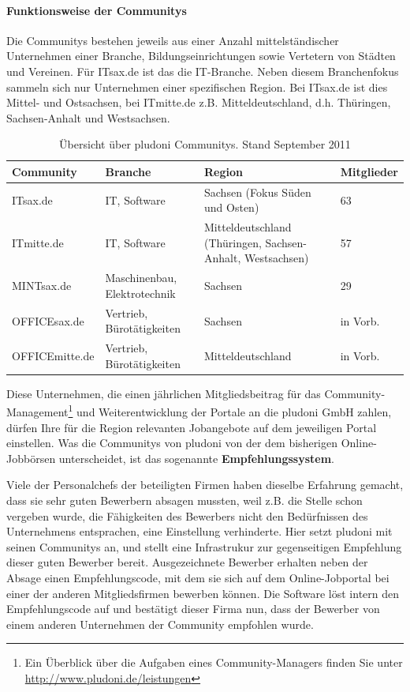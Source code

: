 \paragraph{Funktionsweise der Communitys}
Die Communitys bestehen jeweils aus einer Anzahl mittelständischer Unternehmen einer Branche, Bildungseinrichtungen sowie Vertetern von Städten und Vereinen. Für ITsax.de ist das die IT-Branche. Neben diesem Branchenfokus sammeln sich nur Unternehmen einer spezifischen Region. Bei ITsax.de ist dies Mittel- und Ostsachsen, bei ITmitte.de z.B. Mitteldeutschland, d.h. Thüringen, Sachsen-Anhalt und Westsachsen. 
\begin{table}[htbp]
\label{tb:dt}
\caption{Übersicht über pludoni Communitys. Stand September 2011}
\begin{tabular}{|l|p{2.8cm}|p{5cm}|l|}
\hline
\rowcolor{Gray}
Community & Branche & Region & Mitglieder \\\hline
ITsax.de & IT, Software &  Sachsen (Fokus Süden und Osten) & 63\\\hline
ITmitte.de & IT, Software &  Mitteldeutschland (Thüringen, Sachsen-Anhalt, Westsachsen) & 57 \\\hline
MINTsax.de & Maschinenbau, Elektrotechnik &  Sachsen & 29\\\hline
OFFICEsax.de & Vertrieb, Bürotätigkeiten &  Sachsen & in Vorb.\\\hline
OFFICEmitte.de & Vertrieb, Bürotätigkeiten &  Mitteldeutschland & in Vorb.\\\hline
\end{tabular}
\end{table}

Diese Unternehmen, die einen jährlichen Mitgliedsbeitrag für das Community-Management\footnote{Ein Überblick über die Aufgaben eines Community-Managers finden Sie unter \url{http://www.pludoni.de/leistungen}} und Weiterentwicklung der Portale an die pludoni GmbH zahlen, dürfen Ihre für die Region relevanten Jobangebote auf dem jeweiligen Portal einstellen. Was die Communitys von pludoni von der dem bisherigen Online-Jobbörsen unterscheidet, ist das sogenannte \textbf{Empfehlungssystem}. 

Viele der Personalchefs der beteiligten Firmen haben dieselbe Erfahrung gemacht, dass sie sehr guten Bewerbern absagen mussten, weil z.B. die Stelle schon vergeben wurde, die Fähigkeiten des Bewerbers nicht den Bedürfnissen des Unternehmens entsprachen, eine Einstellung verhinderte. Hier setzt pludoni mit seinen Communitys an, und stellt eine Infrastrukur zur gegenseitigen Empfehlung dieser guten Bewerber bereit.  Ausgezeichnete Bewerber erhalten neben der Absage einen Empfehlungscode, mit dem sie sich auf dem Online-Jobportal bei einer der anderen Mitgliedsfirmen bewerben können. Die Software löst intern den Empfehlungscode auf und bestätigt dieser Firma nun, dass der Bewerber von einem anderen Unternehmen der Community empfohlen wurde. 

